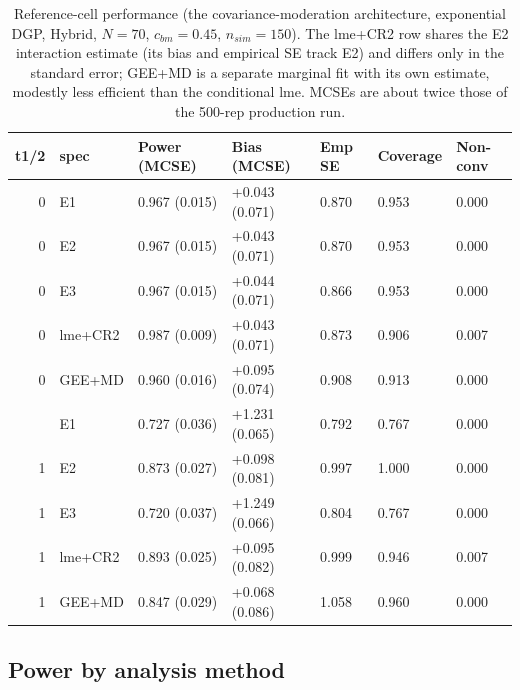 \documentclass[
  11pt,
]{article}
\begin{document}
\begin{table}

\caption{\label{tab:headline-dev}Reference-cell performance (the covariance-moderation architecture, exponential
    DGP, Hybrid, $N = 70$, $c_{bm} = 0.45$, $n_{sim} = 150$). The
    lme+CR2 row shares the E2 interaction estimate (its bias and
    empirical SE track E2) and differs only in the standard error;
    GEE+MD is a separate marginal fit with its own estimate,
    modestly less efficient than the conditional lme. MCSEs are
    about twice those of the 500-rep production run.}
\centering
\begin{tabular}[t]{rllllll}
\toprule
t1/2 & spec & Power (MCSE) & Bias (MCSE) & Emp SE & Coverage & Non-conv\\
\midrule
0 & E1 & 0.967 (0.015) & +0.043 (0.071) & 0.870 & 0.953 & 0.000\\
0 & E2 & 0.967 (0.015) & +0.043 (0.071) & 0.870 & 0.953 & 0.000\\
0 & E3 & 0.967 (0.015) & +0.044 (0.071) & 0.866 & 0.953 & 0.000\\
0 & lme+CR2 & 0.987 (0.009) & +0.043 (0.071) & 0.873 & 0.906 & 0.007\\
0 & GEE+MD & 0.960 (0.016) & +0.095 (0.074) & 0.908 & 0.913 & 0.000\\
\addlinespace
1 & E1 & 0.727 (0.036) & +1.231 (0.065) & 0.792 & 0.767 & 0.000\\
1 & E2 & 0.873 (0.027) & +0.098 (0.081) & 0.997 & 1.000 & 0.000\\
1 & E3 & 0.720 (0.037) & +1.249 (0.066) & 0.804 & 0.767 & 0.000\\
1 & lme+CR2 & 0.893 (0.025) & +0.095 (0.082) & 0.999 & 0.946 & 0.007\\
1 & GEE+MD & 0.847 (0.029) & +0.068 (0.086) & 1.058 & 0.960 & 0.000\\
\bottomrule
\end{tabular}
\end{table}

\subsection{Power by analysis method}\label{power-by-analysis-method}
\end{document}
